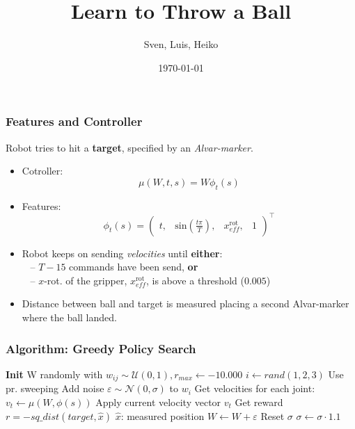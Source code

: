 \documentclass{beamer}
\title{Learn to Throw a Ball}
\author{Sven, Luis, Heiko}
\date{\today}
\begin{document}
\maketitle

\begin{frame}
    \frametitle{Features and Controller}
    Robot tries to hit a \textbf{target}, specified by an \textit{Alvar-marker}.
    \begin{itemize}
        \item Cotroller: $$\mu(W, t, s) = W \phi_t(s)$$ 
        \item Features: $$\phi_t(s) = \begin{pmatrix}t,& \mathrm{sin}\left(\frac{t \pi}{T}\right),& x_{eff}^{\mathrm{rot}},& 1 \end{pmatrix}^\top $$
        \item Robot keeps on sending \textit{velocities} until \textbf{either}:\\
        ~ -- $T - 15$ commands have been send, \textbf{or}\\
        ~ -- $x$-rot. of the gripper, $x_{eff}^{\mathrm{rot}}$, is above a threshold ($0.005$)
        \item Distance between ball and target is measured placing a second Alvar-marker where the ball landed.
    \end{itemize}
\end{frame}

\begin{frame}
    \frametitle{Algorithm: Greedy Policy Search}
        \begin{algorithmic}
            \State \textbf{Init} W randomly with $w_{ij} \sim \mathcal U(0, 1), r_{max} \gets -10.000$
            \State $i \gets rand(1, 2, 3)$
            \Comment Use pr. sweeping
            \State Add noise $\varepsilon \sim \mathcal N(0, \sigma)$ to $w_{i}$
            \State Get velocities for each joint: $v_t \gets \mu(W, \phi(s))$
            \State Apply current velocity vector $v_t$
            \EndFor
            \State Get reward $r = -sq\_dist(target, \hat{x})$
            \Comment $\hat{x}$: measured position
            \State $W \gets W + \varepsilon$
            \State Reset $\sigma$
            \Else
            \State $\sigma \gets \sigma \cdot 1.1$
            \EndIf
            \EndWhile
        \end{algorithmic}
    \end{frame}
    
\end{document}
